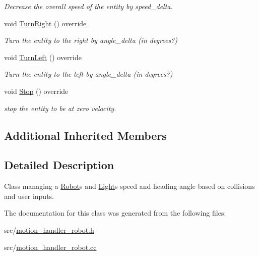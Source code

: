 \begin{DoxyCompactItemize}
\begin{DoxyCompactList}\small\item\em Decrease the overall speed of the entity by speed\+\_\+delta. \end{DoxyCompactList}\item 
void \hyperlink{class_motion_handler_robot_a4b18204b7c7f7f8a3cbb7f0e8ccf088f}{Turn\+Right} () override\hypertarget{class_motion_handler_robot_a4b18204b7c7f7f8a3cbb7f0e8ccf088f}{}\label{class_motion_handler_robot_a4b18204b7c7f7f8a3cbb7f0e8ccf088f}

\begin{DoxyCompactList}\small\item\em Turn the entity to the right by angle\+\_\+delta (in degrees?) \end{DoxyCompactList}\item 
void \hyperlink{class_motion_handler_robot_a955ca2693c4188ffb08cfde469e58252}{Turn\+Left} () override\hypertarget{class_motion_handler_robot_a955ca2693c4188ffb08cfde469e58252}{}\label{class_motion_handler_robot_a955ca2693c4188ffb08cfde469e58252}

\begin{DoxyCompactList}\small\item\em Turn the entity to the left by angle\+\_\+delta (in degrees?) \end{DoxyCompactList}\item 
void \hyperlink{class_motion_handler_robot_a735287a2ab240ae0655def3afb0839f1}{Stop} () override\hypertarget{class_motion_handler_robot_a735287a2ab240ae0655def3afb0839f1}{}\label{class_motion_handler_robot_a735287a2ab240ae0655def3afb0839f1}

\begin{DoxyCompactList}\small\item\em stop the entity to be at zero velocity. \end{DoxyCompactList}\end{DoxyCompactItemize}
\subsection*{Additional Inherited Members}


\subsection{Detailed Description}
Class managing a \hyperlink{class_robot}{Robot}\textquotesingle{}s and \hyperlink{class_light}{Light}\textquotesingle{}s speed and heading angle based on collisions and user inputs. 

The documentation for this class was generated from the following files\+:\begin{DoxyCompactItemize}
\item 
src/\hyperlink{motion__handler__robot_8h}{motion\+\_\+handler\+\_\+robot.\+h}\item 
src/\hyperlink{motion__handler__robot_8cc}{motion\+\_\+handler\+\_\+robot.\+cc}\end{DoxyCompactItemize}
